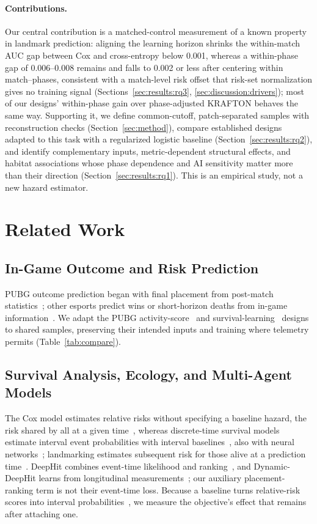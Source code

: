 \documentclass[sigconf,anonymous,nonacm]{acmart}
\begin{document}
\paragraph{Contributions.}
Our central contribution is a matched-control measurement of a known property in landmark prediction: aligning the learning horizon shrinks the within-match AUC gap between Cox and cross-entropy below 0.001, whereas a within-phase gap of 0.006--0.008 remains and falls to 0.002 or less after centering within match--phases, consistent with a match-level risk offset that risk-set normalization gives no training signal (Sections~\ref{sec:results:rq3}, \ref{sec:discussion:drivers}); most of our designs' within-phase gain over phase-adjusted KRAFTON behaves the same way. Supporting it, we define common-cutoff, patch-separated samples with reconstruction checks (Section~\ref{sec:method}), compare established designs adapted to this task with a regularized logistic baseline (Section~\ref{sec:results:rq2}), and identify complementary inputs, metric-dependent structural effects, and habitat associations whose phase dependence and AI sensitivity matter more than their direction (Section~\ref{sec:results:rq1}). This is an empirical study, not a new hazard estimator.

\section{Related Work}
\label{sec:related}

\subsection{In-Game Outcome and Risk Prediction}
\label{sec:related:esports}
PUBG outcome prediction began with final placement from post-match statistics~\cite{KagglePUBG,LeeLee25}; other esports predict wins or short-horizon deaths from in-game information~\cite{Hodge21,Katona19,Marshall22}.
We adapt the PUBG activity-score~\cite{Sagong25a} and survival-learning~\cite{KRAFTON} designs to shared samples, preserving their intended inputs and training where telemetry permits (Table~\ref{tab:compare}).
\subsection{Survival Analysis, Ecology, and Multi-Agent Models}
\label{sec:related:survival}
The Cox model estimates relative risks without specifying a baseline hazard, the risk shared by all at a given time~\cite{Cox72}, whereas discrete-time survival models estimate interval event probabilities with interval baselines~\cite{SingerWillett93}, also with neural networks~\cite{Gensheimer19}; landmarking estimates subsequent risk for those alive at a prediction time~\cite{vanHouwelingen07}.
DeepHit combines event-time likelihood and ranking~\cite{DeepHit18}, and Dynamic-DeepHit learns from longitudinal measurements~\cite{DynamicDeepHit20}; our auxiliary placement-ranking term is not their event-time loss.
Because a baseline turns relative-risk scores into interval probabilities~\cite{PrenticeGloeckler78}, we measure the objective's effect that remains after attaching one.
\end{document}
